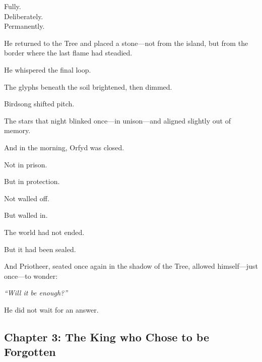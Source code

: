 \documentclass[12pt]{article}
\begin{document}
\vspace{0.5em}
Fully.\\
Deliberately.\\
Permanently.

\vspace{0.5em}
He returned to the Tree and placed a stone---not from the island, but from the border where the last flame had steadied.

\vspace{0.5em}
He whispered the final loop.

\vspace{0.5em}
The glyphs beneath the soil brightened, then dimmed.

\vspace{0.5em}
Birdsong shifted pitch.

\vspace{0.5em}
The stars that night blinked once---in unison---and aligned slightly out of memory.

\vspace{0.5em}
And in the morning, Orfyd was closed.

\vspace{0.5em}
Not in prison.

\vspace{0.5em}
But in protection.

\vspace{0.5em}
Not walled off.

\vspace{0.5em}
But walled in.

\vspace{0.5em}
The world had not ended.

\vspace{0.5em}
But it had been sealed.

\vspace{0.5em}
And Priotheer, seated once again in the shadow of the Tree, allowed himself---just once---to wonder:

\vspace{0.5em}
\textit{``Will it be enough?''}

\vspace{0.5em}
He did not wait for an answer.


\newpage

\subsection*{Chapter 3: The King who Chose to be Forgotten}

\vspace{.5in}
\end{document}
